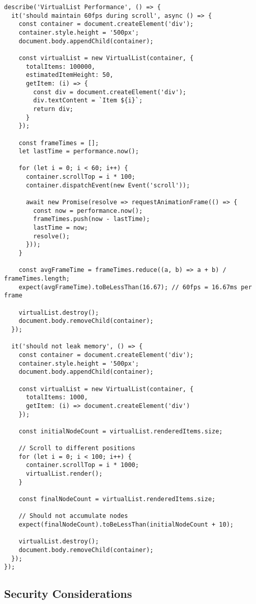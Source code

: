 \documentclass[11pt]{article}
\begin{document}
\begin{verbatim}
describe('VirtualList Performance', () => {
  it('should maintain 60fps during scroll', async () => {
    const container = document.createElement('div');
    container.style.height = '500px';
    document.body.appendChild(container);
    
    const virtualList = new VirtualList(container, {
      totalItems: 100000,
      estimatedItemHeight: 50,
      getItem: (i) => {
        const div = document.createElement('div');
        div.textContent = `Item ${i}`;
        return div;
      }
    });
    
    const frameTimes = [];
    let lastTime = performance.now();
    
    for (let i = 0; i < 60; i++) {
      container.scrollTop = i * 100;
      container.dispatchEvent(new Event('scroll'));
      
      await new Promise(resolve => requestAnimationFrame(() => {
        const now = performance.now();
        frameTimes.push(now - lastTime);
        lastTime = now;
        resolve();
      }));
    }
    
    const avgFrameTime = frameTimes.reduce((a, b) => a + b) / frameTimes.length;
    expect(avgFrameTime).toBeLessThan(16.67); // 60fps = 16.67ms per frame
    
    virtualList.destroy();
    document.body.removeChild(container);
  });
  
  it('should not leak memory', () => {
    const container = document.createElement('div');
    container.style.height = '500px';
    document.body.appendChild(container);
    
    const virtualList = new VirtualList(container, {
      totalItems: 1000,
      getItem: (i) => document.createElement('div')
    });
    
    const initialNodeCount = virtualList.renderedItems.size;
    
    // Scroll to different positions
    for (let i = 0; i < 100; i++) {
      container.scrollTop = i * 1000;
      virtualList.render();
    }
    
    const finalNodeCount = virtualList.renderedItems.size;
    
    // Should not accumulate nodes
    expect(finalNodeCount).toBeLessThan(initialNodeCount + 10);
    
    virtualList.destroy();
    document.body.removeChild(container);
  });
});
\end{verbatim}
\subsection{Security Considerations}
\label{sec:org4bd81d6}
\end{document}
